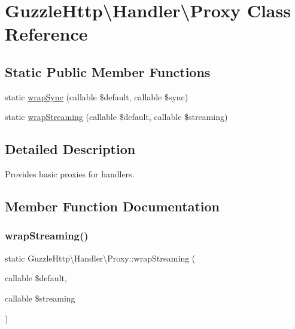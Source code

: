 \hypertarget{classGuzzleHttp_1_1Handler_1_1Proxy}{}\section{Guzzle\+Http\textbackslash{}Handler\textbackslash{}Proxy Class Reference}
\label{classGuzzleHttp_1_1Handler_1_1Proxy}
\subsection*{Static Public Member Functions}
\begin{DoxyCompactItemize}
\item 
static \hyperlink{classGuzzleHttp_1_1Handler_1_1Proxy_a788af0a41900ab50f18ed6756f783a32}{wrap\+Sync} (callable \$default, callable \$sync)
\item 
static \hyperlink{classGuzzleHttp_1_1Handler_1_1Proxy_a3eb17e0ee6eb5247132554a708d4949b}{wrap\+Streaming} (callable \$default, callable \$streaming)
\end{DoxyCompactItemize}


\subsection{Detailed Description}
Provides basic proxies for handlers. 

\subsection{Member Function Documentation}
\mbox{\label{classGuzzleHttp_1_1Handler_1_1Proxy_a3eb17e0ee6eb5247132554a708d4949b}} 
\subsubsection{\texorpdfstring{wrap\+Streaming()}{wrapStreaming()}}
{\footnotesize\ttfamily static Guzzle\+Http\textbackslash{}\+Handler\textbackslash{}\+Proxy\+::wrap\+Streaming (\begin{DoxyParamCaption}\item[{callable}]{\$default,  }\item[{callable}]{\$streaming }\end{DoxyParamCaption})\hspace{0.3cm}{\ttfamily [static]}}

